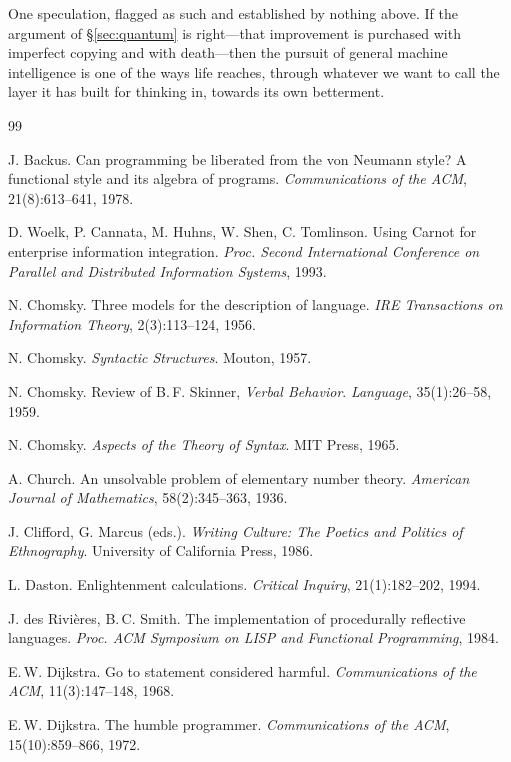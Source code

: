 \documentclass[11pt,a4paper]{article}
\begin{document}
One speculation, flagged as such and established by nothing above. If the
argument of \S\ref{sec:quantum} is right---that improvement is purchased with
imperfect copying and with death---then the pursuit of general machine
intelligence is one of the ways life reaches, through whatever we want to call
the layer it has built for thinking in, towards its own betterment.


\begin{thebibliography}{99}
\small

 J. Backus. Can programming be liberated from the von Neumann
style? A functional style and its algebra of programs. \emph{Communications of the
ACM}, 21(8):613--641, 1978.

 D. Woelk, P. Cannata, M. Huhns, W. Shen, C. Tomlinson. Using
Carnot for enterprise information integration. \emph{Proc. Second International
Conference on Parallel and Distributed Information Systems}, 1993.

 N. Chomsky. Three models for the description of language.
\emph{IRE Transactions on Information Theory}, 2(3):113--124, 1956.

 N. Chomsky. \emph{Syntactic Structures}. Mouton, 1957.

 N. Chomsky. Review of B.\,F. Skinner, \emph{Verbal Behavior}.
\emph{Language}, 35(1):26--58, 1959.

 N. Chomsky. \emph{Aspects of the Theory of Syntax}. MIT
Press, 1965.

 A. Church. An unsolvable problem of elementary number theory.
\emph{American Journal of Mathematics}, 58(2):345--363, 1936.

 J. Clifford, G. Marcus (eds.). \emph{Writing Culture: The
Poetics and Politics of Ethnography}. University of California Press, 1986.

 L. Daston. Enlightenment calculations. \emph{Critical
Inquiry}, 21(1):182--202, 1994.

 J. des Rivi\`eres, B.\,C. Smith. The implementation of
procedurally reflective languages. \emph{Proc. ACM Symposium on LISP and Functional
Programming}, 1984.

 E.\,W. Dijkstra. Go to statement considered harmful.
\emph{Communications of the ACM}, 11(3):147--148, 1968.

 E.\,W. Dijkstra. The humble programmer. \emph{Communications
of the ACM}, 15(10):859--866, 1972.


\end{thebibliography}
\end{document}
